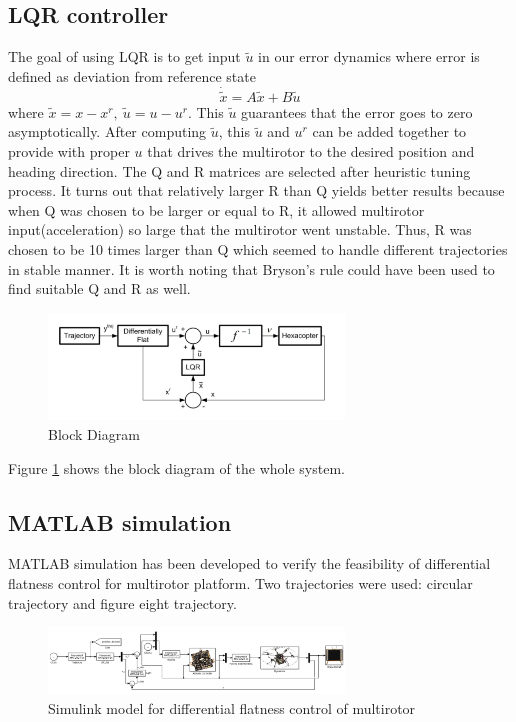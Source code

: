 \documentclass{article}
\begin{document}
\subsection*{LQR controller}
The goal of using LQR is to get input $\tilde{u}$ in our error dynamics where error is defined as deviation from reference state
\[\dot{\tilde{x}}=A\tilde{x}+B\tilde{u}\]
where $\tilde{x}=x-x^r,\ \tilde{u}=u-u^r$. This $\tilde{u}$ guarantees that the error goes to zero asymptotically. After computing $\tilde{u}$, this $\tilde{u}$ and $u^r$ can be added together to provide with proper $u$ that drives the multirotor to the desired position and heading direction. The Q and R matrices are selected after heuristic tuning process. It turns out that relatively larger R than Q yields better results because when Q was chosen to be larger or equal to R, it allowed multirotor input(acceleration) so large that the multirotor went unstable. Thus, R was chosen to be 10 times larger than Q which seemed to handle different trajectories in stable manner. It is worth noting that Bryson's rule could have been used to find suitable Q and R as well.
 
\begin{figure}[h!]
	\centering
	\includegraphics[width=0.7\textwidth]{block_diagram.png}
	\caption{Block Diagram}
	\label{block_diagram}
\end{figure}

Figure \ref{block_diagram} shows the block diagram of the whole system. 

\subsection*{MATLAB simulation}
MATLAB simulation has been developed to verify the feasibility of differential flatness control for multirotor platform. Two trajectories were used: circular trajectory and figure eight trajectory.

\begin{figure}[h!]
	\centering
	\includegraphics[width=0.7\textwidth]{MATLAB.png}
	\caption{Simulink model for differential flatness control of multirotor}
	\label{MATLAB}
\end{figure}
\end{document}
